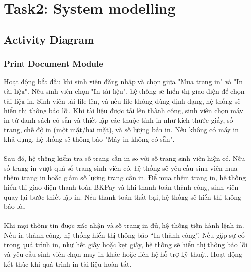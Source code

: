 \section{Task2: System modelling}
\subsection{Activity Diagram}
\subsubsection{Print Document Module}
Hoạt động bắt đầu khi sinh viên đăng nhập và chọn giữa "Mua trang in" và "In tài liệu". Nếu sinh viên chọn "In tài liệu", hệ thống sẽ hiển thị giao diện để chọn tài liệu in. Sinh viên tải file lên, và nếu file không đúng định dạng, hệ thống sẽ hiển thị thông báo lỗi. Khi tài liệu được tải lên thành công, sinh viên chọn máy in từ danh sách có sẵn và thiết lập các thuộc tính in như kích thước giấy, số trang, chế độ in (một mặt/hai mặt), và số lượng bản in. Nếu không có máy in khả dụng, hệ thống sẽ thông báo "Máy in không có sẵn".
\\ \\
Sau đó, hệ thống kiểm tra số trang cần in so với số trang sinh viên hiện có. Nếu số trang in vượt quá số trang sinh viên có, hệ thống sẽ yêu cầu sinh viên mua thêm trang in hoặc giảm số lượng trang cần in. Để mua thêm trang in, hệ thống hiển thị giao diện thanh toán BKPay và khi thanh toán thành công, sinh viên quay lại bước thiết lập in. Nếu thanh toán thất bại, hệ thống sẽ hiển thị thông báo lỗi.
\\ \\
Khi mọi thông tin được xác nhận và số trang in đủ, hệ thống tiến hành lệnh in. Nếu in thành công, hệ thống hiển thị thông báo “In thành công”. Nếu gặp sự cố trong quá trình in, như hết giấy hoặc kẹt giấy, hệ thống sẽ hiển thị thông báo lỗi và yêu cầu sinh viên chọn máy in khác hoặc liên hệ hỗ trợ kỹ thuật. Hoạt động kết thúc khi quá trình in tài liệu hoàn tất.

